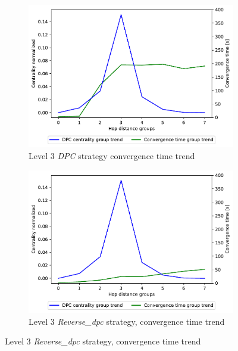 \documentclass[10pt,conference,letterpaper]{IEEEtran}
\newcommand{\figwidth}{0.78}
\begin{document}
\begin{figure}[tb]
	\begin{subfigure}{.49\columnwidth}
		\centering
		\includegraphics[width=\figwidth\columnwidth]{images/different_levels/1000-DPC-l7_node-conv_MRAI30_centVStime_trend.pdf}
		\caption{Level 3 \textit{DPC} strategy convergence time trend}
		\label{fig:1000-dpc-time-trend-level3}
	\end{subfigure}
	\hfill
	\begin{subfigure}{.49\columnwidth}
		\centering
		\includegraphics[width=\figwidth\columnwidth]{images/different_levels/1000-reverse_dpc-l7_node-conv_MRAI30_centVStime_trend.pdf}
		\caption{Level 3 \textit{Reverse\_dpc} strategy, convergence time trend}
		\label{fig:1000-reverse-dpc-time-trend-level3}
	\end{subfigure}


\end{figure}
\end{document}
